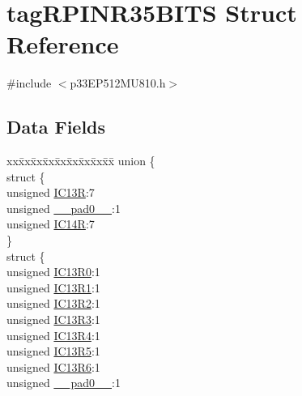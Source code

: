 \hypertarget{structtag_r_p_i_n_r35_b_i_t_s}{}\section{tag\+R\+P\+I\+N\+R35\+B\+I\+TS Struct Reference}
\label{structtag_r_p_i_n_r35_b_i_t_s}


{\ttfamily \#include $<$p33\+E\+P512\+M\+U810.\+h$>$}

\subsection*{Data Fields}
\begin{DoxyCompactItemize}
\item 
\begin{tabbing}
xx\=xx\=xx\=xx\=xx\=xx\=xx\=xx\=xx\=\kill
union \{\\
\>struct \{\\
\>\>unsigned \hyperlink{structtag_r_p_i_n_r35_b_i_t_s_a54ce7f85af694b8fae47e7f1f407ceb7}{IC13R}:7\\
\>\>unsigned \hyperlink{structtag_r_p_i_n_r35_b_i_t_s_adf71f3d8410c1f1dbbc96680a92c49af}{\_\_pad0\_\_}:1\\
\>\>unsigned \hyperlink{structtag_r_p_i_n_r35_b_i_t_s_a72837b94f971c29947b24b2718579495}{IC14R}:7\\
\>\} \\
\>struct \{\\
\>\>unsigned \hyperlink{structtag_r_p_i_n_r35_b_i_t_s_a1844a2a15071b712343da94cd21ddb50}{IC13R0}:1\\
\>\>unsigned \hyperlink{structtag_r_p_i_n_r35_b_i_t_s_a6270cd553ec1179a1fca4363624eb130}{IC13R1}:1\\
\>\>unsigned \hyperlink{structtag_r_p_i_n_r35_b_i_t_s_a9533f42d994f08800a03ad40515f5a61}{IC13R2}:1\\
\>\>unsigned \hyperlink{structtag_r_p_i_n_r35_b_i_t_s_aef17ef76bf5ec5f55cf618b8a4c43d15}{IC13R3}:1\\
\>\>unsigned \hyperlink{structtag_r_p_i_n_r35_b_i_t_s_a44940ea821cb473bb9cfd24f2511bd7f}{IC13R4}:1\\
\>\>unsigned \hyperlink{structtag_r_p_i_n_r35_b_i_t_s_aa755de30401a06b768855b6110362b6c}{IC13R5}:1\\
\>\>unsigned \hyperlink{structtag_r_p_i_n_r35_b_i_t_s_a2509e1dca8938acd2fe4631bbd6a0e5a}{IC13R6}:1\\
\>\>unsigned \hyperlink{structtag_r_p_i_n_r35_b_i_t_s_adf71f3d8410c1f1dbbc96680a92c49af}{\_\_pad0\_\_}:1\\

\end{tabbing}
\end{DoxyCompactItemize}
